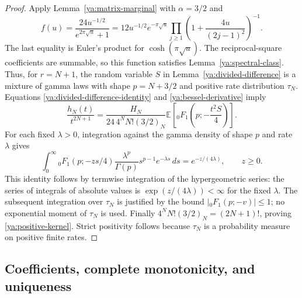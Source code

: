 \documentclass[11pt,a4paper]{article}
\theoremstyle{definition}
\theoremstyle{remark}
\numberwithin{equation}{section}
\begin{document}
\begin{proof}
Apply Lemma~\ref{ya:matrix-marginal} with $\alpha=3/2$ and
\[
 f(u)=\frac{24u^{-1/2}}{e^{2\pi\sqrt u}+1}
 =12u^{-1/2}e^{-\pi\sqrt u}
        \prod_{j\ge1}\left(1+\frac{4u}{(2j-1)^2}\right)^{-1}.
\]
The last equality is Euler's product for $\cosh(\pi\sqrt u)$.
The reciprocal-square coefficients are summable, so this function
satisfies Lemma~\ref{ya:spectral-class}.
Thus, for $r=N+1$, the random variable $S$ in
Lemma~\ref{ya:divided-difference} is a mixture of gamma laws with
shape $p=N+3/2$ and positive rate distribution $\tau_N$.
Equations \eqref{ya:divided-difference-identity} and
\eqref{ya:bessel-derivative} imply
\[
 \frac{h_N(t)}{t^{2N+1}}
 =\frac{H_N}{24\,4^NN!(3/2)_N}
       \mathbb E\left[{}_0F_1\left(p;-\frac{t^2S}{4}\right)\right].
\]
For each fixed $\lambda>0$, integration against the gamma density
of shape $p$ and rate $\lambda$ gives
\[
 \int_0^\infty {}_0F_1(p;-zs/4)
       \frac{\lambda^p}{\Gamma(p)}s^{p-1}e^{-\lambda s}\,ds
       =e^{-z/(4\lambda)},\qquad z\ge0.
\]
This identity follows by termwise integration of the hypergeometric
series: the series of integrals of absolute values is
$\exp(z/(4\lambda))<\infty$ for the fixed $\lambda$.
The subsequent integration over $\tau_N$ is justified by the bound
$|{}_0F_1(p;-v)|\le1$; no exponential moment of $\tau_N$ is used.
Finally $4^NN!(3/2)_N=(2N+1)!$, proving
\eqref{ya:positive-kernel}. Strict positivity follows because
$\tau_N$ is a probability measure on positive finite rates.
\end{proof}

\subsection{Coefficients, complete monotonicity, and uniqueness}
\end{document}
